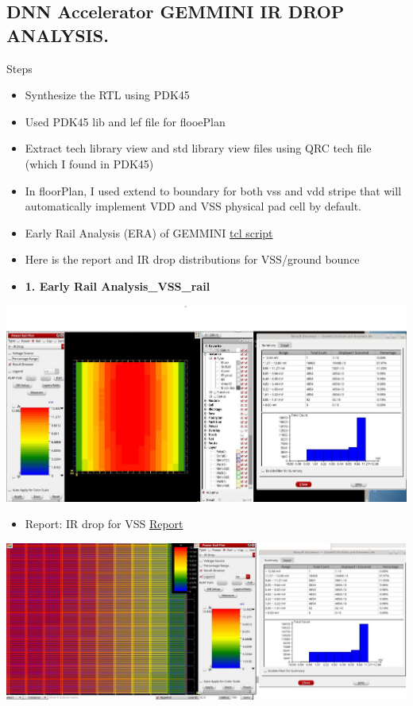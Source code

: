 \documentclass[a4paper]{article}
\begin{document}
\subsection{DNN Accelerator GEMMINI IR DROP ANALYSIS.}
\label{sec:org0771867}
Steps
\begin{itemize}
\item Synthesize the RTL using PDK45
\item Used PDK45 lib and lef file for flooePlan
\item Extract tech library view and std library view files using QRC tech file (which I found in PDK45)
\item In floorPlan, I used extend to boundary for both vss and vdd stripe that will automatically implement VDD and VSS physical pad cell by default.
\item Early Rail Analysis (ERA) of GEMMINI \href{./innovus\_rail\_analysis.tcl}{tcl script}
\item Here is the report and IR drop distributions for VSS/ground bounce
\item \textbf{\textbf{1. Early Rail Analysis\_VSS\_rail}}
\end{itemize}
\begin{center}
\includegraphics[width=.9\linewidth]{./img/ERA_VSS_Bounce_Gemmini.jpg}
\end{center}
\begin{itemize}
\item Report: IR drop for VSS \href{./rep/VSS.main.html}{Report}
\end{itemize}
\begin{center}
\includegraphics[width=.9\linewidth]{./img/vss_era.jpg}
\end{center}
\end{document}
